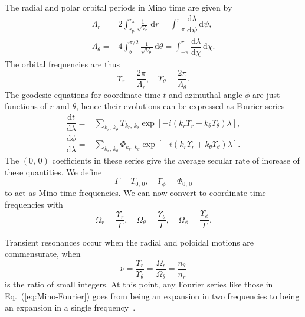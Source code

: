 \documentclass[aps,prd,amsfonts,amssymb,amsmath,nofootinbib,showpacs,superscriptaddress,twocolumn,floatfix]{revtex4-1}
\newcommand{\eqnref}[1]{Eq.~(\ref{eq:#1})}
\newcommand{\sub}[1]{\ensuremath{_\mathrm{#1}}}
\newcommand{\dd}{\ensuremath{\mathrm{d}}}
\newcommand{\diff}[2]{\ensuremath{\dfrac{\dd {#1}}{\dd {#2}}}}
\newcommand{\recip}[1]{\ensuremath{\frac{1}{#1}}}
\newcommand{\intd}[4]{\ensuremath{\int_{#1}^{#2}{#3}\,\dd{#4}}}
\begin{document}
The radial and polar orbital periods in Mino time are given by
\begin{subequations}
\begin{align}
\Lambda_r = {} & 2\intd{r\sub{p}}{r\sub{a}}{\recip{\sqrt{V_r}}}{r} = \intd{-\pi}{\pi}{\diff{\lambda}{\psi}}{\psi}, \\
\Lambda_\theta = {} & 4\intd{\theta_-}{\pi/2}{\recip{\sqrt{V_\theta}}}{\theta} = \intd{-\pi}{\pi}{\diff{\lambda}{\chi}}{\chi}.
\end{align}
\end{subequations}
The orbital frequencies are thus~\cite{Fujita2009}
\begin{equation}
\Upsilon_r = \frac{2\pi}{\Lambda_r}, \quad \Upsilon_\theta = \frac{2\pi}{\Lambda_\theta}.
\end{equation}
The geodesic equations for coordinate time $t$ and azimuthal angle $\phi$ are just functions of $r$ and $\theta$, hence their evolutions can be expressed as Fourier series~\cite{Drasco2004}
\begin{subequations}
\begin{align}
\diff{t}{\lambda} = {} & \sum_{k_r,\,k_\theta}T_{k_r,\, k_\theta}\exp\left[-i\left(k_r\Upsilon_r + k_\theta\Upsilon_\theta\right)\lambda\right], \\
\diff{\phi}{\lambda} = {} & \sum_{k_r,\,k_\theta}\Phi_{k_r,\, k_\theta}\exp\left[-i\left(k_r\Upsilon_r + k_\theta\Upsilon_\theta\right)\lambda\right].
\label{eq:Mino-Fourier}
\end{align}
\end{subequations}
The $(0,\,0)$ coefficients in these series give the average secular rate of increase of these quantities. We define
\begin{equation}
\Gamma = T_{0,\,0}, \quad \Upsilon_\phi = \Phi_{0,\,0}
\end{equation}
to act as Mino-time frequencies. We can now convert to coordinate-time frequencies with~\cite{Drasco2004}
\begin{equation}
\Omega_r = \frac{\Upsilon_r}{\Gamma}, \quad \Omega_\theta = \frac{\Upsilon_\theta}{\Gamma}, \quad \Omega_\phi = \frac{\Upsilon_\phi}{\Gamma}.
\end{equation}

Transient resonances occur when the radial and poloidal motions are commensurate, when
\begin{equation}
\nu = \frac{\Upsilon_r}{\Upsilon_\theta} = \frac{\Omega_r}{\Omega_\theta} = \frac{n_\theta}{n_r}
\end{equation}
is the ratio of small integers. At this point, any Fourier series like those in \eqnref{Mino-Fourier} goes from being an expansion in two frequencies to being an expansion in a single frequency~\cite{Bosley1992}.
\end{document}
